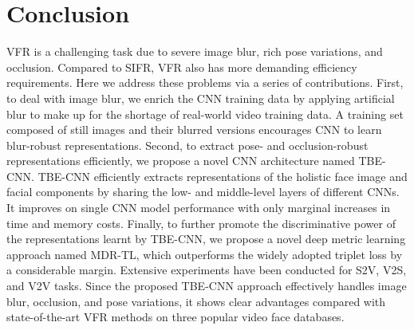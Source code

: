 \documentclass[10pt,journal,cspaper,compsoc]{IEEEtran}
\begin{document}
\section{Conclusion}
\label{Sec:Conclusion}
VFR is a challenging task due to severe image blur, rich pose variations, and occlusion.
Compared to SIFR, VFR also has more demanding efficiency requirements.
Here we address these problems via a series of contributions.
First, to deal with image blur, we enrich the CNN training data by applying artificial blur to make up for the shortage of real-world video training data.
A training set composed of still images and their blurred versions encourages CNN to learn blur-robust representations.
Second, to extract pose- and occlusion-robust representations efficiently,
we propose a novel CNN architecture named TBE-CNN.
TBE-CNN efficiently extracts representations of the holistic face image and facial components by sharing the low- and middle-level layers of different CNNs.
It improves on single CNN model performance with only marginal increases in time and memory costs.
Finally, to further promote the discriminative power of the representations learnt by TBE-CNN, we propose a novel deep metric learning approach named MDR-TL,
which outperforms the widely adopted triplet loss by a considerable margin.
Extensive experiments have been conducted for S2V, V2S, and V2V tasks.
Since the proposed TBE-CNN approach effectively handles image blur, occlusion, and pose variations,
it shows clear advantages compared with state-of-the-art VFR methods on three popular video face databases.



%
\end{document}
